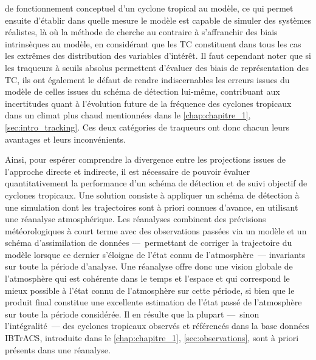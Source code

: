 \documentclass[../main.tex]{subfiles}
\begin{document}
de fonctionnement conceptuel d'un cyclone tropical au modèle, ce qui permet ensuite d'établir dans quelle mesure le modèle est capable de simuler des systèmes
réalistes, là où la méthode de \cite{camargo_improving_2002} cherche au contraire à s'affranchir des biais intrinsèques au modèle, en considérant que les TC
constituent dans tous les cas les extrêmes des distribution des variables d'intérêt. Il faut cependant noter que si les traqueurs à seuils absolus permettent
d'évaluer des biais de représentation des TC, ils ont également le défaut de rendre indiscernables les erreurs issues du modèle de celles issues du schéma de
détection lui-même, contribuant aux incertitudes quant à l'évolution future de la fréquence des cyclones tropicaux dans un climat plus chaud mentionnées dans le
\cref{chap:chapitre_1}, \cref{sec:intro_tracking}. Ces deux catégories de traqueurs ont donc chacun leurs avantages et leurs inconvénients.

Ainsi, pour espérer comprendre la divergence entre les projections issues de l'approche directe et indirecte, il est nécessaire de pouvoir évaluer
quantitativement la performance d'un schéma de détection et de suivi objectif de cyclones tropicaux. Une solution consiste à appliquer un schéma de détection à
une simulation dont les trajectoires sont à priori connues d'avance, en utilisant une réanalyse atmosphérique. Les réanalyses combinent des prévisions
météorologiques à court terme avec des observations passées via un modèle et un schéma d'assimilation de données ---~permettant de corriger la trajectoire du
modèle lorsque ce dernier s'éloigne de l'état connu de l'atmosphère~--- invariants sur toute la période d'analyse. Une réanalyse offre donc une vision globale
de l'atmosphère qui est cohérente dans le temps et l'espace et qui correspond le mieux possible à l'état connu de l'atmosphère sur cette période, si bien que le
produit final constitue une excellente estimation de l'état passé de l'atmosphère sur toute la période considérée. Il en résulte que la plupart ---~sinon
l'intégralité~--- des cyclones tropicaux observés et référencés dans la base données IBTrACS, introduite dans le \cref{chap:chapitre_1},
\cref{sec:observations}, sont à priori présents dans une réanalyse.
\end{document}
